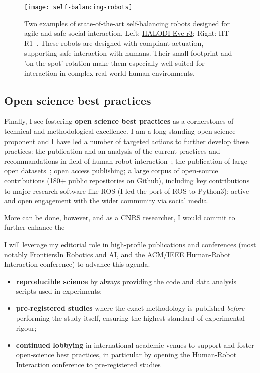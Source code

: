 \begin{figure}[ht]
    \centering
    \texttt{[image: self-balancing-robots]}
    \caption{Two examples of state-of-the-art self-balancing robots designed for
    agile and safe social interaction.  Left:
    \href{https://www.halodi.com/ever3}{HALODI Eve r3}; Right: IIT
    R1~\parencite{parmiggiani2017design}. These robots are designed with
   compliant actuation, supporting safe interaction with humans. Their small
    footprint and 'on-the-spot' rotation make them especially
   well-suited for interaction in complex real-world human environments.}
    \label{fig:selfbalancingrobots}
\end{figure}

\subsection{Open science best practices}

Finally, I see fostering \textbf{open science best practices} as a cornerstones
of technical and methodological excellence. I am a long-standing open science
proponent and I have led a number of targeted actions to further develop these
practices: the publication and an analysis of the current practices and
recommandations in field of human-robot
interaction~\autocite{baxter2016characterising}; the publication of large open
datasets~\autocite{childrenspeech2016, pinsoro2018, lemaignan2018pinsoro}; open
access publishing; a large corpus of open-source contributions
(\href{https://github.com/severin-lemaignan}{180+ public repositories on
Github}), including key contributions to major research software like ROS (I led
the port of ROS to Python3); active and open engagement with the wider community
via social media.

More can be done, however, and as a CNRS researcher, I would commit to further
enhance the 

I will leverage my editorial role in high-profile publications and
conferences (most notably FrontiersIn Robotics and AI, and the ACM/IEEE
Human-Robot Interaction conference) to advance this agenda.

\begin{itemize}
    \item \textbf{reproducible science} by always providing the code and data
        analysis scripts used in experiments;
    \item \textbf{pre-registered studies} where the exact methodology is
        published \emph{before} performing the study itself, ensuring the
        highest standard of experimental rigour;
    \item \textbf{continued lobbying} in international academic venues to
        support and foster open-science best practices, in particular by opening
        the Human-Robot Interaction conference to pre-registered studies
\end{itemize}

